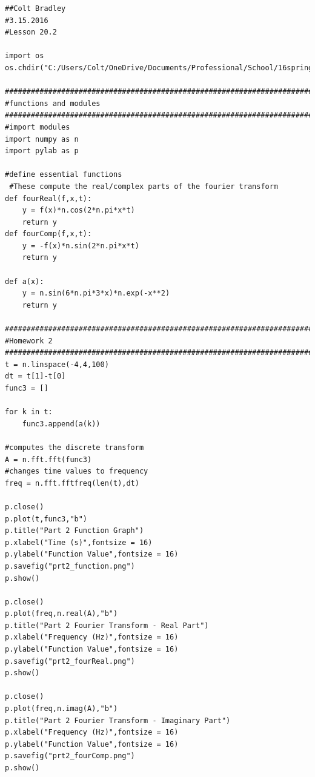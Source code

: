 \documentclass[11pt]{article}
\begin{document}
\begin{verbatim}
##Colt Bradley
#3.15.2016
#Lesson 20.2

import os
os.chdir("C:/Users/Colt/OneDrive/Documents/Professional/School/16spring/PY_251/20.FourierAnalysis")

#############################################################################
#functions and modules
#############################################################################
#import modules
import numpy as n
import pylab as p

#define essential functions
 #These compute the real/complex parts of the fourier transform        
def fourReal(f,x,t):
    y = f(x)*n.cos(2*n.pi*x*t)
    return y
def fourComp(f,x,t):
    y = -f(x)*n.sin(2*n.pi*x*t)
    return y
    
def a(x):
    y = n.sin(6*n.pi*3*x)*n.exp(-x**2)
    return y

#############################################################################
#Homework 2
#############################################################################
t = n.linspace(-4,4,100)
dt = t[1]-t[0]
func3 = []

for k in t:
    func3.append(a(k))

#computes the discrete transform
A = n.fft.fft(func3)
#changes time values to frequency
freq = n.fft.fftfreq(len(t),dt)

p.close()
p.plot(t,func3,"b")
p.title("Part 2 Function Graph")
p.xlabel("Time (s)",fontsize = 16)
p.ylabel("Function Value",fontsize = 16)
p.savefig("prt2_function.png")
p.show()

p.close()
p.plot(freq,n.real(A),"b")
p.title("Part 2 Fourier Transform - Real Part")
p.xlabel("Frequency (Hz)",fontsize = 16)
p.ylabel("Function Value",fontsize = 16)
p.savefig("prt2_fourReal.png")
p.show()

p.close()
p.plot(freq,n.imag(A),"b")
p.title("Part 2 Fourier Transform - Imaginary Part")
p.xlabel("Frequency (Hz)",fontsize = 16)
p.ylabel("Function Value",fontsize = 16)
p.savefig("prt2_fourComp.png")
p.show()
\end{verbatim}
\end{document}

